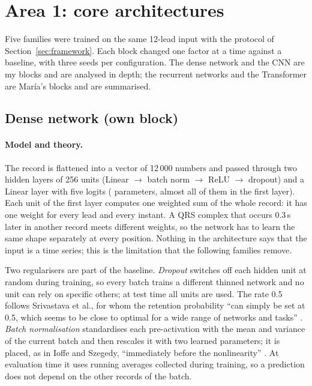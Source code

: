 \section{Area 1: core architectures}\label{sec:arch}

Five families were trained on the same 12-lead input with the protocol of
Section~\ref{sec:framework}. Each block changed one factor at a time against a baseline, with three
seeds per configuration. The dense network and the CNN are my blocks and are analysed in depth; the
recurrent networks and the Transformer are Mar\'ia's blocks and are summarised.

\subsection{Dense network (own block)}\label{sec:dense}

\paragraph{Model and theory.} The record is flattened into a vector of 12\,000 numbers and passed
through two hidden layers of 256 units (Linear $\to$ batch norm $\to$ ReLU $\to$ dropout) and a Linear
layer with five logits (\denseParamsBase{} parameters, almost all of them in the first layer). Each
unit of the first layer computes one weighted sum of the whole record: it has one weight for every
lead and every instant. A QRS complex that occurs 0.3\,s later in another record meets different
weights, so the network has to learn the same shape separately at every position. Nothing in the
architecture says that the input is a time series; this is the limitation that the following
families remove.

Two regularisers are part of the baseline. \emph{Dropout} switches off each hidden unit at random
during training, so every batch trains a different thinned network and no unit can rely on specific
others; at test time all units are used. The rate 0.5 follows Srivastava et al., for whom the retention
probability ``can simply be set at 0.5, which seems to be close to optimal for a wide range of networks
and tasks'' \cite[p.~1930]{srivastava2014dropout}. \emph{Batch normalisation} standardises each
pre-activation with the mean and variance of the current batch and then rescales it with two learned
parameters; it is placed, as in Ioffe and Szegedy, ``immediately before the nonlinearity''
\cite[p.~5]{ioffe2015batch}. At evaluation time it uses running averages collected during training,
so a prediction does not depend on the other records of the batch.

